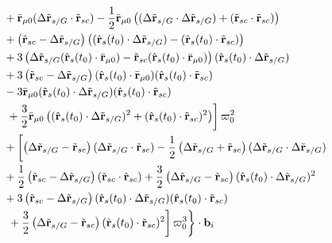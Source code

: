 \begin{figure}[ht]
\begin{equation}
\begin{split}
&{} + \bar\R_{\mu0} (\Delta \tilde\R_{s/G} \cdot \tilde\R_{sc}) - \frac{1}{2} \bar\R_{\mu0}\left( (\Delta \tilde\R_{s/G} \cdot \Delta \tilde\R_{s/G}) + (\tilde\R_{sc} \cdot \tilde\R_{sc})\right)\\
&{}+ \left(\tilde\R_{sc}  - \Delta \tilde\R_{s/G}\right)\left( (\hat\R_s(t_0) \cdot \Delta \tilde\R_{s/G}) - (\hat\R_s(t_0) \cdot \tilde\R_{sc})\right) \\
&{} + 3\left(\Delta \tilde\R_{s/G} (\hat\R_s(t_0) \cdot \bar\R_{\mu0})  - \tilde\R_{sc} (\hat\R_s(t_0) \cdot \bar\R_{\mu0})\right)(\hat\R_s(t_0) \cdot \Delta \tilde\R_{s/G})\\
&{}+ 3\left(\tilde\R_{sc} - \Delta \tilde\R_{s/G}\right)(\hat\R_s(t_0) \cdot \bar\R_{\mu0}) (\hat\R_s(t_0) \cdot \tilde\R_{sc})  \\
&{} - 3\bar\R_{\mu0} (\hat\R_s(t_0) \cdot \Delta \tilde\R_{s/G}) (\hat\R_s(t_0) \cdot \tilde\R_{sc})\\
&\left.{} + \frac{3}{2} \bar\R_{\mu0}\left( (\hat\R_s(t_0) \cdot \Delta \tilde\R_{s/G})^2+ (\hat\R_s(t_0) \cdot \tilde\R_{sc})^2\right)\right]\varpi_0^2\\
%
&{} + \left[\left(\Delta \tilde\R_{s/G}  - \tilde\R_{sc}\right)(\Delta \tilde\R_{s/G} \cdot \tilde\R_{sc}) - \frac{1}{2}\left( \Delta \tilde\R_{s/G} +\tilde\R_{sc}\right)(\Delta \tilde\R_{s/G} \cdot \Delta \tilde\R_{s/G}) \right.\\
&{}+ \frac{1}{2} \left(\tilde\R_{sc} -  \Delta \tilde\R_{s/G} \right)(\tilde\R_{sc} \cdot \tilde\R_{sc}) + \frac{3}{2} \left(\Delta \tilde\R_{s/G}  - \tilde\R_{sc}\right)(\hat\R_s(t_0) \cdot \Delta \tilde\R_{s/G})^2 \\
&{} + 3\left(\tilde\R_{sc}- \Delta \tilde\R_{s/G}\right) (\hat\R_s(t_0) \cdot \Delta \tilde\R_{s/G}) (\hat\R_s(t_0) \cdot \tilde\R_{sc}) \\
&\left.\left.{} + \frac{3}{2} \left(\Delta \tilde\R_{s/G} - \tilde\R_{sc}\right) (\hat\R_s(t_0) \cdot \tilde\R_{sc})^2 \right]\varpi_0^3\right\}\cdot \mf b_i
\end{split}
\end{equation}
\end{figure}

